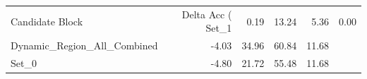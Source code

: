 \begin{tabular}{lrrrr}
\toprule
Candidate Block & Delta Acc (%
\midrule
Set_1 & 0.19 & 13.24 & 5.36 & 0.00 \\
Dynamic_Region_All_Combined & -4.03 & 34.96 & 60.84 & 11.68 \\
Set_0 & -4.80 & 21.72 & 55.48 & 11.68 \\
\bottomrule
\end{tabular}
